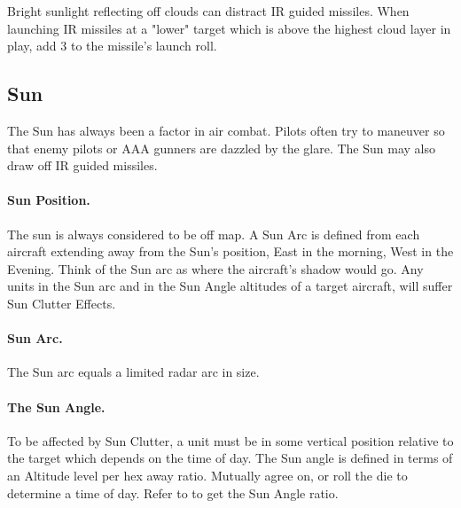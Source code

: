 Bright sunlight reflecting off clouds can distract IR guided missiles. When launching IR missiles at a "lower" target which is above the highest cloud layer in play, add 3 to the missile's launch roll.


\subsection{Sun}

The Sun has always been a factor in air combat. Pilots often try to maneuver so that enemy pilots or AAA gunners are dazzled by the glare. The Sun may also draw off IR guided missiles.

\paragraph{Sun Position.} The sun is always considered to be off map. A Sun Arc is defined from each aircraft extending away from the Sun's position, East in the morning, West in the Evening. Think of the Sun arc as where the aircraft's shadow would go. Any units in the Sun arc and in the Sun Angle altitudes of a target aircraft, will suffer Sun Clutter Effects.

\paragraph{Sun Arc.} The Sun arc equals a limited radar arc in size. 


\paragraph{The Sun Angle.} To be affected by Sun Clutter, a unit must be in some vertical position relative to the target which depends on the time of day. The Sun angle is defined in terms of an Altitude level per hex away ratio. Mutually agree on, or roll the die to determine a time of day. Refer to  to get the Sun Angle ratio.



